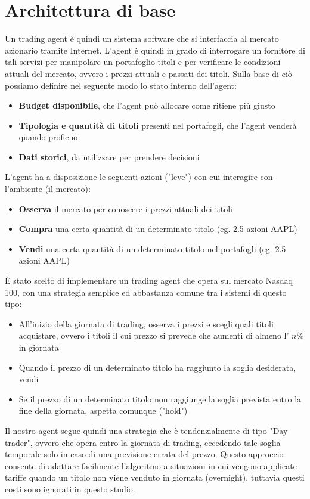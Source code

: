 \documentclass[binding=0.6cm]{sapthesis}
\begin{document}
		\section{Architettura di base}
			Un trading agent è quindi un sistema software che si interfaccia al mercato azionario tramite Internet. L'agent è quindi in grado di interrogare un fornitore di tali servizi per
			manipolare un portafoglio titoli e per verificare le condizioni attuali del mercato, ovvero i prezzi attuali e passati dei titoli. Sulla base di ciò possiamo definire nel seguente
			modo lo stato interno dell'agent:
			\begin{itemize}
				\item \textbf{Budget disponibile}, che l'agent può allocare come ritiene più giusto
				\item \textbf{Tipologia e quantità di titoli} presenti nel portafogli, che l'agent venderà quando proficuo
				\item \textbf{Dati storici}, da utilizzare per prendere decisioni
			\end{itemize}
			L'agent ha a disposizione le seguenti azioni ("leve") con cui interagire con l'ambiente (il mercato):
			\begin{itemize}
				\item \textbf{Osserva} il mercato per conoscere i prezzi attuali dei titoli
				\item \textbf{Compra} una certa quantità di un determinato titolo (eg. 2.5 azioni AAPL)
				\item \textbf{Vendi} una certa quantità di un determinato titolo nel portafogli (eg. 2.5 azioni AAPL)
			\end{itemize}
			È stato scelto di implementare un trading agent che opera sul mercato Nasdaq 100, con una strategia semplice ed abbastanza comune tra i sistemi di questo tipo:
			\begin{itemize}
				\item All'inizio della giornata di trading, osserva i prezzi e scegli quali titoli acquistare, ovvero i titoli il cui prezzo si prevede che aumenti di almeno l' $n\%$ in giornata
				\item Quando il prezzo di un determinato titolo ha raggiunto la soglia desiderata, vendi
				\item Se il prezzo di un determinato titolo non raggiunge la soglia prevista entro la fine della giornata, aspetta comunque ("hold")
			\end{itemize}
			Il nostro agent segue quindi una strategia che è tendenzialmente di tipo "Day trader", ovvero che opera entro la giornata di trading, eccedendo tale soglia temporale solo in caso di
			una previsione errata del prezzo. Questo approccio consente di adattare facilmente l'algoritmo a situazioni in cui vengono applicate tariffe quando un titolo non viene venduto in giornata
			(overnight), tuttavia questi costi sono ignorati in questo studio.
\end{document}
